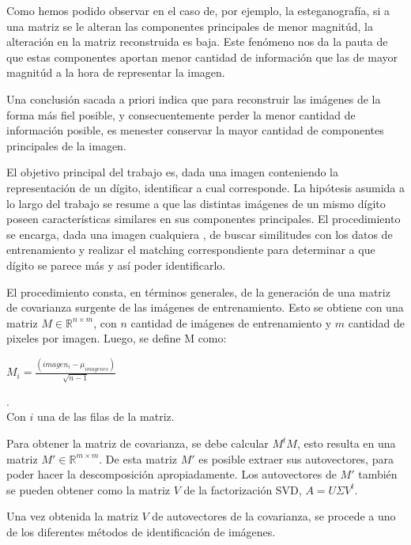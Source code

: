 Como hemos podido observar en el caso de, por ejemplo, la esteganograf\'ia, si a una matriz se le alteran
las componentes principales de menor magnit\'ud, la alteraci\'on en la matriz reconstruida es baja.
Este fen\'omeno nos da la pauta de que estas componentes aportan menor cantidad de informaci\'on
que las de mayor magnit\'ud a la hora de representar la imagen.

Una conclusi\'on sacada a priori indica que para reconstruir las im\'agenes de la forma m\'as fiel posible,
y consecuentemente perder la menor cantidad de informaci\'on posible, es menester conservar la mayor cantidad
de componentes principales de la imagen.

El objetivo principal del trabajo es, dada una imagen conteniendo la representaci\'on de un d\'igito,
identificar a cual corresponde. La hip\'otesis asumida a lo largo del trabajo se
resume a que las distintas im\'agenes de un mismo d\'igito poseen caracter\'isticas 
similares en sus componentes principales. El procedimiento se encarga, dada una imagen cualquiera
, de buscar similitudes con los datos de entrenamiento y realizar el matching correspondiente
para determinar a que d\'igito se parece m\'as y as\'i poder identificarlo.

El procedimiento consta, en t\'erminos generales, de la generaci\'on de una 
matriz de covarianza surgente de las im\'agenes de entrenamiento. 
Esto se obtiene con una matriz $M \in \mathbb{R}^{n \times m}$, con $n$ cantidad
de im\'agenes de entrenamiento y $m$ cantidad de pixeles por imagen. Luego, se define M como:
\\

\centerline{$M_i = \frac{(imagen_i - \mu_{imagenes})}{\sqrt{n-1}}$}.
\\
Con $i$ una de las filas de la matriz.

Para obtener la matriz de covarianza, se debe calcular $M^t M$, esto resulta en una matriz $M' \in \mathbb{R}^{m \times m}$.
De esta matriz $M'$ es posible extraer sus autovectores, para poder hacer la descomposici\'on apropiadamente.
Los autovectores de $M'$ tambi\'en se pueden obtener como la matriz $V$ de la factorizaci\'on SVD, $A=U\Sigma V^t$.

Una vez obtenida la matriz $V$ de autovectores de la covarianza, se procede a uno de los diferentes m\'etodos de
identificaci\'on de im\'agenes.
